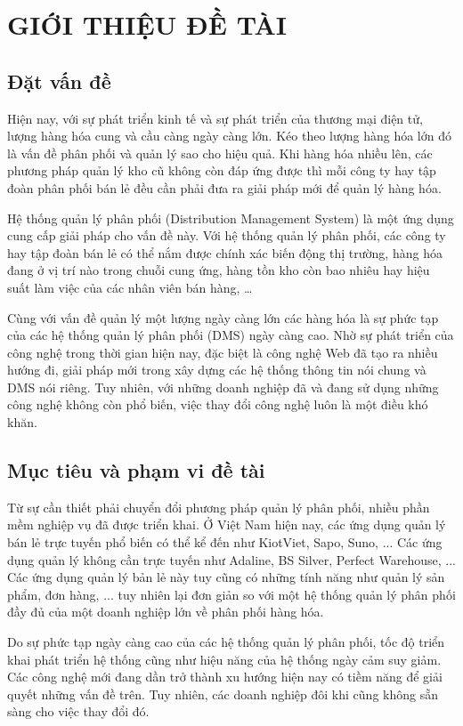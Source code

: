 \chapter{GIỚI THIỆU ĐỀ TÀI}

\section{Đặt vấn đề}
Hiện nay, với sự phát triển kinh tế và sự phát triển của thương mại
điện tử, lượng hàng hóa cung và cầu càng ngày càng lớn. Kéo theo lượng
hàng hóa lớn đó là vấn đề phân phối và quản lý sao cho hiệu quả. Khi hàng
hóa nhiều lên, các phương pháp quản lý kho cũ không còn đáp ứng được
thì mỗi công ty hay tập đoàn phân phối bán lẻ đều cần phải đưa ra giải pháp
mới để quản lý hàng hóa.

Hệ thống quản lý phân phối (Distribution Management System) là một ứng dụng
cung cấp giải pháp cho vấn đề này. Với hệ thống quản lý phân phối,
các công ty hay tập đoàn bán lẻ có thể nắm
được chính xác biến động thị trường,
hàng hóa đang ở vị trí nào trong chuỗi cung ứng, hàng tồn kho còn bao
nhiêu hay hiệu suất làm việc của các nhân viên bán hàng, …

Cùng với vấn đề quản lý một lượng ngày càng lớn các hàng hóa là sự phức
tạp của các hệ thống quản lý phân phối (DMS) ngày càng cao. Nhờ sự
phát triển của công nghệ trong thời gian hiện nay, đặc biệt là công nghệ
Web đã tạo ra nhiều hướng đi, giải pháp mới trong xây dựng các hệ thống
thông tin nói chung và DMS nói riêng. Tuy nhiên, với những doanh nghiệp
đã và đang sử dụng những công nghệ không còn phổ biến, việc thay đổi
công nghệ luôn là một điều khó khăn.

\section{Mục tiêu và phạm vi đề tài}
Từ sự cần thiết phải chuyển đổi phương pháp quản lý phân phối, nhiều phần
mềm nghiệp vụ đã được triển khai. Ở Việt Nam hiện nay, các ứng dụng
quản lý bán lẻ trực tuyến phổ biến có thể kể đến như KiotViet, Sapo, Suno,
... Các ứng dụng quản lý không cần trực tuyến như Adaline, BS Silver,
Perfect Warehouse, ... Các ứng dụng quản lý bản lẻ này tuy cũng có
những tính năng như quản lý sản phẩm, đơn hàng, ... tuy nhiên lại đơn giản
so với một hệ thống quản lý phân phối đầy đủ của một doanh nghiệp lớn về
phân phối hàng hóa.

Do sự phức tạp ngày càng cao của các hệ thống quản lý phân phối, tốc độ
triển khai phát triển hệ thống cũng như hiệu năng của hệ thống ngày cảm
suy giảm. Các công nghệ mới đang dần trở thành xu hướng hiện nay có tiềm
năng để giải quyết những vấn đề trên. Tuy nhiên, các doanh nghiệp đôi
khi cũng không sẵn sàng cho việc thay đổi đó.

